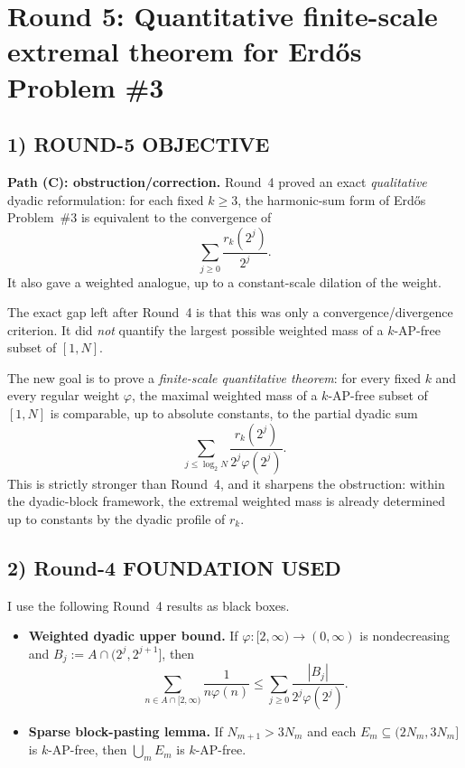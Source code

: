 \section{Round 5: Quantitative finite-scale extremal theorem for Erd\H{o}s Problem \#3}

\subsection{1) ROUND-5 OBJECTIVE}

\textbf{Path (C): obstruction/correction.}
Round~4 proved an exact \emph{qualitative} dyadic reformulation: for each fixed $k\ge 3$, the harmonic-sum form of Erd\H{o}s Problem~\#3 is equivalent to the convergence of
\[
\sum_{j\ge 0}\frac{r_k(2^j)}{2^j}.
\]
It also gave a weighted analogue, up to a constant-scale dilation of the weight.

The exact gap left after Round~4 is that this was only a convergence/divergence criterion. It did \emph{not} quantify the largest possible weighted mass of a $k$-AP-free subset of $[1,N]$.

The new goal is to prove a \emph{finite-scale quantitative theorem}: for every fixed $k$ and every regular weight $\varphi$, the maximal weighted mass of a $k$-AP-free subset of $[1,N]$ is comparable, up to absolute constants, to the partial dyadic sum
\[
\sum_{j\le \log_2 N}\frac{r_k(2^j)}{2^j\varphi(2^j)}.
\]
This is strictly stronger than Round~4, and it sharpens the obstruction: within the dyadic-block framework, the extremal weighted mass is already determined up to constants by the dyadic profile of $r_k$.

\subsection{2) Round-4 FOUNDATION USED}

I use the following Round~4 results as black boxes.

\begin{itemize}
\item \textbf{Weighted dyadic upper bound.} If $\varphi:[2,\infty)\to(0,\infty)$ is nondecreasing and $B_j:=A\cap(2^j,2^{j+1}]$, then
\[
\sum_{n\in A\cap[2,\infty)}\frac{1}{n\varphi(n)}
\le
\sum_{j\ge 0}\frac{|B_j|}{2^j\varphi(2^j)}.
\]
\item \textbf{Sparse block-pasting lemma.} If $N_{m+1}>3N_m$ and each $E_m\subseteq (2N_m,3N_m]$ is $k$-AP-free, then $\bigcup_m E_m$ is $k$-AP-free.
\end{itemize}

